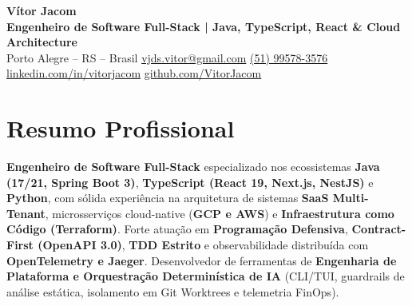 \documentclass[10pt, letterpaper]{article}
\newenvironment{header}{
    \setlength{\topsep}{0pt}\par\kern\topsep\centering\linespread{1.1}
}{
    \par\kern\topsep
}
\begin{document}
\fontsize{8.7pt}{10.4pt}\selectfont

\begin{header}
    {\fontsize{19 pt}{19 pt}\selectfont \textbf{V\'itor Jacom}} \\
    \vspace{1 pt}
    {\small \textbf{Engenheiro de Software Full-Stack | Java, TypeScript, React \& Cloud Architecture}} \\
    \vspace{1 pt}
    \footnotesize
    Porto Alegre -- RS -- Brasil \quad \href{mailto:vjds.vitor@gmail.com}{vjds.vitor@gmail.com} \quad \href{tel:+5551995783576}{(51) 99578-3576} \quad
    \href{https://www.linkedin.com/in/vitorjacom/}{linkedin.com/in/vitorjacom} \quad \href{https://github.com/VitorJacom}{github.com/VitorJacom}
\end{header}

\section*{Resumo Profissional}
\textbf{Engenheiro de Software Full-Stack} especializado nos ecossistemas \textbf{Java (17/21, Spring Boot 3)}, \textbf{TypeScript (React 19, Next.js, NestJS)} e \textbf{Python}, com s\'olida experi\^encia na arquitetura de sistemas \textbf{SaaS Multi-Tenant}, microsservi\c{c}os cloud-native (\textbf{GCP e AWS}) e \textbf{Infraestrutura como C\'odigo (Terraform)}. Forte atua\c{c}\~ao em \textbf{Programa\c{c}\~ao Defensiva}, \textbf{Contract-First (OpenAPI 3.0)}, \textbf{TDD Estrito} e observabilidade distribu\'ida com \textbf{OpenTelemetry e Jaeger}. Desenvolvedor de ferramentas de \textbf{Engenharia de Plataforma e Orquestra\c{c}\~ao Determin\'istica de IA} (CLI/TUI, guardrails de an\'alise est\'atica, isolamento em Git Worktrees e telemetria FinOps).

\end{document}
